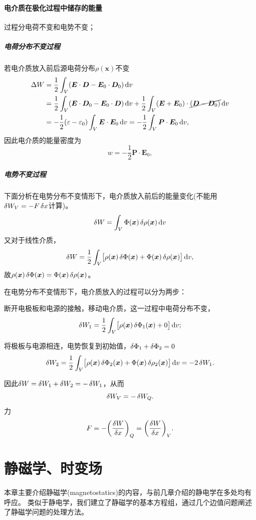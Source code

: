 \paragraph{电介质在极化过程中储存的能量}过程分电荷不变和电势不变；
\subparagraph{电荷分布不变过程}
若电介质放入前后源电荷分布$\rho(\bm x)$不变
\begin{align*}
    \Delta W&=\frac12\int_V(\bm E\cdot\bm D-\bm E_0\cdot\bm D_0)\mathop{}\!\mathrm{d} v\\
    &=\frac12\int_V(\bm E\cdot\bm D_0-\bm E_0\cdot\bm D)\mathop{}\!\mathrm{d} v+\frac12\int_V(\bm E+\bm E_0)\cdot\cancel{(\bm D-\bm D_0)}\mathop{}\!\mathrm{d} v\\
    &=-\frac12(\varepsilon-\varepsilon_0)\int_V\bm E\cdot\bm E_0\mathop{}\!\mathrm{d} v=-\frac12\int_V\bm P\cdot\bm E_0\mathop{}\!\mathrm{d} v,
\end{align*}
因此电介质的能量密度为
\begin{equation}
    w=-\frac12\bm P\cdot\bm E_0,
\end{equation}
\subparagraph{电势不变过程}下面分析在电势分布不变情形下，电介质放入前后的能量变化(不能用$\mathop{}\!\delta W_V=-F\mathop{}\!\delta x$计算)。
\[
    \mathop{}\!\delta W=\int_V\Phi(\bm x)\mathop{}\!\delta\rho(\bm x)\mathop{}\!\mathrm{d} v
\]
又对于线性介质，
\[
    \mathop{}\!\delta W=\frac12\int_V\bigl[\rho(\bm x)\mathop{}\!\delta\Phi(\bm x)+\Phi(\bm x)\mathop{}\!\delta\rho(\bm x)\bigr]\mathop{}\!\mathrm{d} v,
\]
故$\rho(\bm x)\mathop{}\!\delta\Phi(\bm x)=\Phi(\bm x)\mathop{}\!\delta\rho(\bm x)$。

在电势分布不变情形下，电介质放入的过程可以分为两步：
\begin{compactenum}
    \item 断开电极板和电源的接触，移动电介质，这一过程中电荷分布不变，
    \[
        \mathop{}\!\delta W_1=\frac12\int_V\bigl[\rho(\bm x)\mathop{}\!\delta\Phi_1(\bm x)+0\bigr]\mathop{}\!\mathrm{d} v;
    \]
    \item 将极板与电源相连，电势恢复到初始值，$\mathop{}\!\delta\Phi_1+\mathop{}\!\delta\Phi_2=0$
    \[
        \mathop{}\!\delta W_2=\frac12\int_V\bigl[\rho(\bm x)\mathop{}\!\delta\Phi_2(\bm x)+\Phi(\bm x)\mathop{}\!\delta\rho_2(\bm x)\bigr]\mathop{}\!\mathrm{d} v=-2\mathop{}\!\delta W_1.
    \]
\end{compactenum}
因此$\mathop{}\!\delta W=\mathop{}\!\delta W_1+\mathop{}\!\delta W_2=-\mathop{}\!\delta W_1$，从而
\[
    \mathop{}\!\delta W_V=-\mathop{}\!\delta W_Q.
\]
力
\[
    F=-\biggl(\frac{\mathop{}\!\delta W}{\mathop{}\!\delta x}\biggr)_Q=\biggl(\frac{\mathop{}\!\delta W}{\mathop{}\!\delta x}\biggr)_V.
\]
\clearpage
\section{静磁学、时变场}
\label{sec:magnetostatics}
本章主要介绍静磁学(magnetostatics)的内容，与前几章介绍的静电学在多处均有呼应。%
类似于静电学，我们建立了静磁学的基本方程组，通过几个边值问题阐述了静磁学问题的处理方法。%

